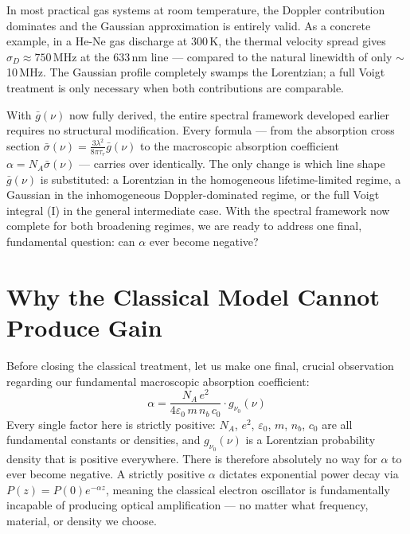 In most practical gas systems at room temperature, the Doppler contribution dominates and the Gaussian approximation is entirely valid. As a concrete example, in a He-Ne gas discharge at 300\,K, the thermal velocity spread gives $\sigma_D \approx 750$\,MHz at the 633\,nm line — compared to the natural linewidth of only $\sim$10\,MHz. The Gaussian profile completely swamps the Lorentzian; a full Voigt treatment is only necessary when both contributions are comparable.

With $\bar{g}(\nu)$ now fully derived, the entire spectral framework developed earlier requires no structural modification. Every formula — from the absorption cross section $\bar{\sigma}(\nu) = \frac{3\lambda^2}{8\pi\tau_r}\bar{g}(\nu)$ to the macroscopic absorption coefficient $\alpha = N_A\bar{\sigma}(\nu)$ — carries over identically. The only change is which line shape $\bar{g}(\nu)$ is substituted: a Lorentzian in the homogeneous lifetime-limited regime, a Gaussian in the inhomogeneous Doppler-dominated regime, or the full Voigt integral \textup{(I)} in the general intermediate case. With the spectral framework now complete for both broadening regimes, we are ready to address one final, fundamental question: can $\alpha$ ever become negative?

\section{Why the Classical Model Cannot Produce Gain}

Before closing the classical treatment, let us make one final, crucial observation regarding our fundamental macroscopic absorption coefficient:
\begin{equation*}
    \alpha = \frac{N_A\,e^2}{4\varepsilon_0\,m\,n_b\,c_0}\cdot g_{\nu_0}(\nu)
\end{equation*}
Every single factor here is strictly positive: $N_A$, $e^2$, $\varepsilon_0$, $m$, $n_b$, $c_0$ are all fundamental constants or densities, and $g_{\nu_0}(\nu)$ is a Lorentzian probability density that is positive everywhere. There is therefore absolutely no way for $\alpha$ to ever become negative. A strictly positive $\alpha$ dictates exponential power decay via $P(z) = P(0)e^{-\alpha z}$, meaning the classical electron oscillator is fundamentally incapable of producing optical amplification — no matter what frequency, material, or density we choose.

